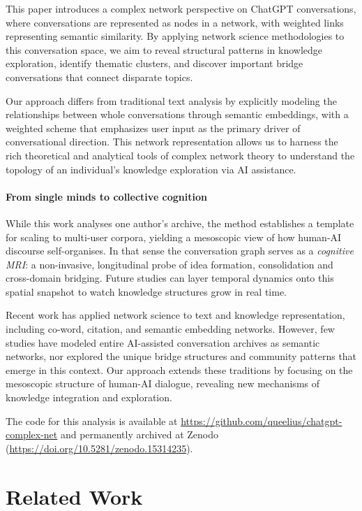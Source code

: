 \documentclass[10pt, a4paper]{article}
\begin{document}
This paper introduces a complex network perspective on ChatGPT conversations, where conversations are represented as nodes in a network, with weighted links representing semantic similarity. By applying network science methodologies to this conversation space, we aim to reveal structural patterns in knowledge exploration, identify thematic clusters, and discover important bridge conversations that connect disparate topics.

Our approach differs from traditional text analysis by explicitly modeling the relationships between whole conversations through semantic embeddings, with a weighted scheme that emphasizes user input as the primary driver of conversational direction. This network representation allows us to harness the rich theoretical and analytical tools of complex network theory to understand the topology of an individual's knowledge exploration via AI assistance.

\paragraph*{From single minds to collective cognition} While this work analyses one author's archive, the method establishes a template for scaling to multi-user corpora, yielding a mesoscopic view of how human-AI discourse self-organises. In that sense the conversation graph serves as a \emph{cognitive MRI}: a non-invasive, longitudinal probe of idea formation, consolidation and cross-domain bridging. Future studies can layer temporal dynamics onto this spatial snapshot to watch knowledge structures grow in real time.

Recent work has applied network science to text and knowledge representation, including co-word, citation, and semantic embedding networks. However, few studies have modeled entire AI-assisted conversation archives as semantic networks, nor explored the unique bridge structures and community patterns that emerge in this context. Our approach extends these traditions by focusing on the mesoscopic structure of human-AI dialogue, revealing new mechanisms of knowledge integration and exploration.

The code for this analysis is available at 
\url{https://github.com/queelius/chatgpt-complex-net} \cite{chatgpt-complex-net}
and permanently archived at Zenodo 
(\url{https://doi.org/10.5281/zenodo.15314235}).

\section{Related Work}
\end{document}
